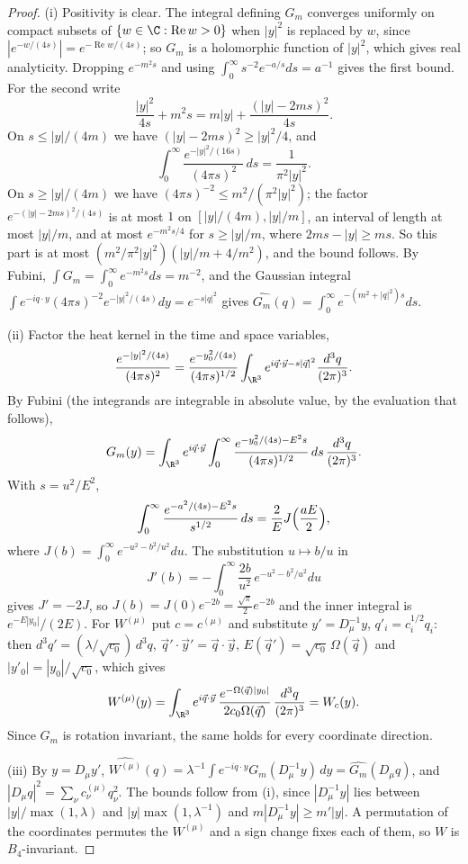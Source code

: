 \begin{proof}
(i) Positivity is clear. The integral defining $G_m$ converges uniformly on
compact subsets of $\{w\in\C:\operatorname{Re}w>0\}$ when $|y|^2$ is replaced
by $w$, since $|e^{-w/(4s)}|=e^{-\operatorname{Re}w/(4s)}$; so $G_m$ is a
holomorphic function of $|y|^2$, which gives real analyticity. Dropping
$e^{-m^2s}$ and using $\int_0^\infty s^{-2}e^{-a/s}ds=a^{-1}$ gives the
first bound. For the second write
\[
\frac{|y|^2}{4s}+m^2s=m|y|+\frac{(|y|-2ms)^2}{4s}.
\]
On $s\le|y|/(4m)$ we have $(|y|-2ms)^2\ge|y|^2/4$, and
\[
\int_0^\infty\frac{e^{-|y|^2/(16s)}}{(4\pi s)^2}\,ds=\frac1{\pi^2|y|^2}.
\]
On $s\ge|y|/(4m)$ we have
$(4\pi s)^{-2}\le m^2/(\pi^2|y|^2)$; the factor $e^{-(|y|-2ms)^2/(4s)}$ is
at most $1$ on $[|y|/(4m),|y|/m]$, an interval of length at most $|y|/m$,
and at most $e^{-m^2s/4}$ for $s\ge|y|/m$, where $2ms-|y|\ge ms$. So this
part is at most $(m^2/\pi^2|y|^2)(|y|/m+4/m^2)$, and the bound follows. By
Fubini, $\int G_m=\int_0^\infty e^{-m^2s}ds=m^{-2}$, and the Gaussian
integral $\int e^{-iq\cdot y}(4\pi s)^{-2}e^{-|y|^2/(4s)}dy=e^{-s|q|^2}$
gives $\widehat{G_m}(q)=\int_0^\infty e^{-(m^2+|q|^2)s}ds$.

(ii) Factor the heat kernel in the time and space variables,
\[
\frac{e^{-|y|^2/(4s)}}{(4\pi s)^2}=\frac{e^{-y_0^2/(4s)}}{(4\pi s)^{1/2}}
\int_{\R^3}e^{i\vec q\cdot\vec y-s|\vec q|^2}\frac{d^3q}{(2\pi)^3}.
\]
By Fubini (the integrands are integrable in absolute value, by the
evaluation that follows),
\[
G_m(y)=\int_{\R^3}e^{i\vec q\cdot\vec y}\int_0^\infty\frac{e^{-y_0^2/(4s)
-E^2s}}{(4\pi s)^{1/2}}\,ds\,\frac{d^3q}{(2\pi)^3}.
\]
With $s=u^2/E^2$,
\[
\int_0^\infty\frac{e^{-a^2/(4s)-E^2s}}{s^{1/2}}\,ds=\frac2EJ\Bigl(\frac{aE}
2\Bigr),
\]
where $J(b)=\int_0^\infty e^{-u^2-b^2/u^2}du$. The substitution $u\mapsto b/u$
in
\[
J'(b)=-\int_0^\infty\frac{2b}{u^2}\,e^{-u^2-b^2/u^2}du
\]
gives $J'=-2J$, so $J(b)=J(0)e^{-2b}=\frac{\sqrt\pi}2e^{-2b}$ and the inner
integral is $e^{-E|y_0|}/(2E)$. For $W^{(\mu)}$ put $c=c^{(\mu)}$
and substitute $y'=D_\mu^{-1}y$, $q'_i=c_i^{1/2}q_i$: then $d^3q'=(\lambda
/\sqrt{c_0})\,d^3q$, $\vec q'\cdot\vec y'=\vec q\cdot\vec y$, $E(\vec q')=
\sqrt{c_0}\,\Omega(\vec q)$ and $|y'_0|=|y_0|/\sqrt{c_0}$, which gives
\[
W^{(\mu)}(y)=\int_{\R^3}e^{i\vec q\cdot\vec y}\,\frac{e^{-\Omega(\vec q)
|y_0|}}{2c_0\Omega(\vec q)}\,\frac{d^3q}{(2\pi)^3}=W_c(y).
\]
Since $G_m$ is rotation invariant, the same holds for every coordinate
direction.

(iii) By $y=D_\mu y'$, $\widehat{W^{(\mu)}}(q)=\lambda^{-1}\int e^{-iq\cdot
y}G_m(D_\mu^{-1}y)\,dy=\widehat{G_m}(D_\mu q)$, and $|D_\mu q|^2=\sum_\nu
c^{(\mu)}_\nu q_\nu^2$. The bounds follow from (i), since $|D_\mu^{-1}y|$ lies
between $|y|/\max(1,\lambda)$ and $|y|\max(1,\lambda^{-1})$ and $m|D_\mu^{-1}y|
\ge m'|y|$.
A permutation of the coordinates permutes the $W^{(\mu)}$ and a sign change
fixes each of them, so $W$ is $B_4$-invariant.
\end{proof}

